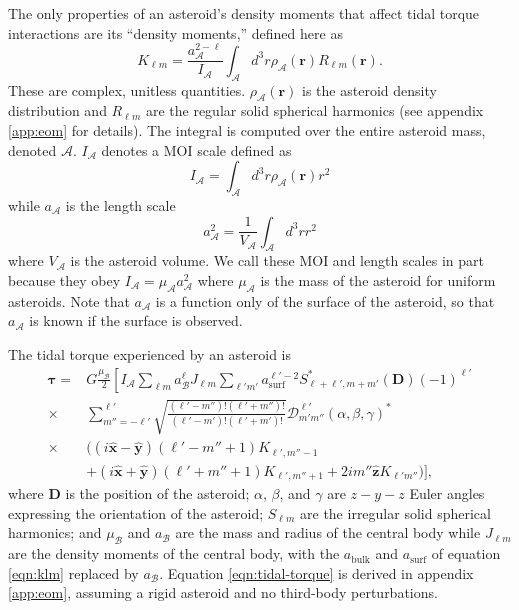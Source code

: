 \documentclass[fleqn,usenatbib]{mnras}
\newcommand{\unit}[1]{\bm{\hat{#1}}}
\begin{document}
The only properties of an asteroid's density moments that affect tidal torque interactions are its ``density moments,'' defined here as
\begin{equation}
  K_{\ell m} = \frac{a_\mathcal{A}^{2-\ell}}{I_\mathcal{A}} \int_\mathcal{A} d^3 r \rho_\mathcal{A}(\bm r) R_{\ell m}(\bm r).
  \label{eqn:klm}
\end{equation}
These are complex, unitless quantities. $\rho_\mathcal{A}(\bm r)$ is the asteroid density distribution and $R_{\ell m}$ are the regular solid spherical harmonics (see appendix \ref{app:eom} for details). The integral is computed over the entire asteroid mass, denoted $\mathcal{A}$. $I_\mathcal{A}$ denotes a MOI scale defined as 
\begin{equation}
  I_\mathcal{A} = \int_\mathcal{A} d^3 r \rho_\mathcal{A}(\bm r) r^2
  \label{eqn:ia}
\end{equation}
while $a_\mathcal{A}$ is the length scale
\begin{equation}
  a_\mathcal{A}^2 = \frac{1}{V_\mathcal{A}} \int_\mathcal{A} d^3 r r^2
  \label{eqn:aa}
\end{equation}
where $V_\mathcal{A}$ is the asteroid volume. We call these MOI and length scales in part because they obey $I_\mathcal{A} = \mu_\mathcal{A} a_\mathcal{A}^2$ where $\mu_\mathcal{A}$ is the mass of the asteroid for uniform asteroids. Note that $a_\mathcal{A}$ is a function only of the surface of the asteroid, so that $a_\mathcal{A}$ is known if the surface is observed.

The tidal torque experienced by an asteroid is 
\begin{equation}
  \begin{split}
  \bm \tau = & G\frac{\mu_\mathcal{B}}{2}\left[I_\mathcal{A} \sum_{\ell m} a_\mathcal{B}^\ell J_{\ell m} \sum_{\ell' m'}a_\text{surf}^{\ell' - 2}S^*_{\ell+\ell', m + m'} (\bm D) (-1)^{\ell'}\right.\\
  \times & \left.\sum_{m''=-\ell'}^{\ell'} \sqrt{\frac{(\ell'-m'')!(\ell'+m'')!}{(\ell'-m')!(\ell'+m')!}}  \mathcal{D}^{\ell'}_{m'm''}(\alpha, \beta, \gamma)^* \right. \\
  \times & \Big((i\unit x - \unit y)(\ell'-m''+1)K_{\ell',m''-1} \\
  & +(i\unit x+\unit y)(\ell'+m''+1)K_{\ell',m''+1}+2im''\unit z K_{\ell'm''}\Big) \Bigg],
  \end{split}
  \label{eqn:tidal-torque}
\end{equation}
where $\bm D$ is the position of the asteroid; $\alpha$, $\beta$, and $\gamma$ are $z-y-z$ Euler angles expressing the orientation of the asteroid; $S_{\ell m}$ are the irregular solid spherical harmonics; and $\mu_\mathcal{B}$ and $a_\mathcal{B}$ are the mass and radius of the central body while $J_{\ell m}$ are the density moments of the central body, with the $a_\text{bulk}$ and $a_\text{surf}$ of equation \ref{eqn:klm} replaced by $a_\mathcal{B}$. Equation \ref{eqn:tidal-torque} is derived in appendix \ref{app:eom}, assuming a rigid asteroid and no third-body perturbations. 
\end{document}
